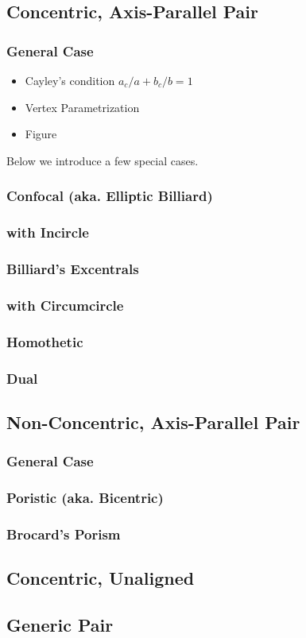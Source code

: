 
\subsection{Concentric, Axis-Parallel Pair}

\subsubsection{General Case}

\begin{itemize}
    \item Cayley's condition $a_c/a+b_c/b=1$
    \item Vertex Parametrization
    \item Figure
\end{itemize}

Below we introduce a few special cases.

\subsubsection{Confocal (aka. Elliptic Billiard)}
\subsubsection{with Incircle}
\subsubsection{Billiard's Excentrals}
\subsubsection{with Circumcircle}
\subsubsection{Homothetic}
\subsubsection{Dual}

\subsection{Non-Concentric, Axis-Parallel Pair}

\subsubsection{General Case}

\subsubsection*{Poristic (aka. Bicentric)}
\subsubsection*{Brocard's Porism}

\subsection{Concentric, Unaligned}

\subsection{Generic Pair}